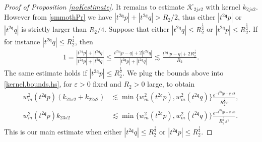 \documentclass[reqno]{amsart}
\newcommand{\pv}{p}
\newcommand{\qv}{q}
\newcommand{\qq}{\mathfrak{q}}
\newcommand{\tqq}{t^{2\qq}}
\newcommand{\compK}{\mathcal{K}}
\newcommand{\smep}{\varepsilon}
\theoremstyle{definition}
\numberwithin{equation}{section}
\numberwithin{theorem}{section}
\begin{document}
\begin{proof}[Proof of Proposition \ref{noKestimate}]
It remains to estimate $\compK_{2js2}$ with kernel $k_{2js2}$.  However from \eqref{smmothPr} we have $ |\tqq p|+ | \tqq q| > R_2/2$, thus either $ | \tqq \pv|$ or $ | \tqq \qv|$ is strictly larger than $R_2/4$.  Suppose that either $ |\tqq \qv| \leq R_2^{\frac12}$ or $ | \tqq \pv| \leq R_2^{\frac12}$.  If for instance $ |\tqq \qv| \leq R_2^{\frac12}$, then 
\begin{align*}
 1=   \frac{ |\tqq p|+  |\tqq q|}{ |\tqq p|+ |\tqq q|} \leq \frac{\tqq |p-q|+2 |\tqq q|}{ |\tqq p|+ |\tqq q|} 
    \lesssim \frac{\tqq |p-q|+2 R_2^{\frac12}}{R_2}. 
\end{align*}
The same estimate holds if $ |\tqq \pv| \leq R_2^{\frac12}$.  We plug the bounds above into \eqref{kernel.bounds.hs}, for $\smep>0$ fixed and $R_2>0$ large,  to obtain
\begin{equation}\label{kernel.bounds.qbd}
\begin{split}
    w_{m}^2(\tqq \pv)\left(k_{21s2}  + k_{22s2} \right)
   & \lesssim
    \min\big\{w_{m}^2(\tqq \pv), w_{m}^2(\tqq \qv)\big\}\frac{e^{- \tqq|p-q|/8}}{R_2^{\frac12} \smep},
\\
   w_{m}^2(\tqq \pv) k_{23s2}
   & \lesssim
   \min\big\{w_{m}^2(\tqq \pv), w_{m}^2(\tqq \qv)\big\} \frac{e^{- \tqq|p-q|/8}}{R_2^{\frac12} \smep^2}.
\end{split}
\end{equation}
This is our main estimate when either $ |\tqq\qv| \leq R_2^{\frac12}$ or $ |\tqq\pv| \leq R_2^{\frac12}$.




\end{proof}
\end{document}
